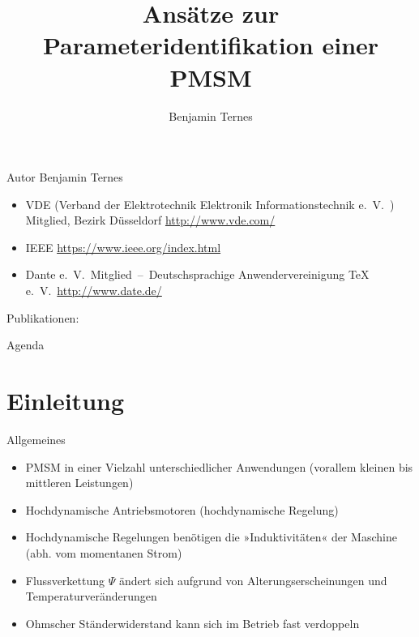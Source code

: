 \documentclass{beamer}
\title[Parameteridentifikation]{Ansätze zur Parameteridentifikation einer PMSM}
\author[Benjamin Ternes]%
{%
Benjamin Ternes
}
\institute{%
Hochschule Bochum\\
Fachbereich Elektrotechnik und Informatik}
\begin{document}
\begin{frame}[plain]
	\titlepage
\end{frame}

\begin{frame}[plain]{Autor}
Benjamin Ternes
\begin{itemize}
	\item VDE (Verband der Elektrotechnik Elektronik Informationstechnik e.\ V.\ ) Mitglied, Bezirk Düsseldorf	\url{http://www.vde.com/}
	\item IEEE \url{https://www.ieee.org/index.html}
	\item Dante e.\ V.\ Mitglied~--~Deutschsprachige Anwendervereinigung TeX e.\ V.\ \url{http://www.date.de/}
\end{itemize}
\vspace{1cm}
Publikationen:\\
\end{frame}

\begin{frame}[plain]{Agenda}
	\tableofcontents
\end{frame}

\section{Einleitung}
\begin{frame}{Allgemeines}
\begin{itemize}
\item PMSM in einer Vielzahl unterschiedlicher Anwendungen (vorallem kleinen bis mittleren Leistungen)
\item Hochdynamische Antriebsmotoren (hochdynamische Regelung)
\item Hochdynamische Regelungen benötigen die »Induktivitäten« der Maschine (abh. vom momentanen Strom)
\item Flussverkettung $\Psi$ ändert sich aufgrund von Alterungserscheinungen und Temperaturveränderungen
\item Ohmscher Ständerwiderstand kann sich im Betrieb fast verdoppeln
\end{itemize}
\end{frame}
\end{document}
